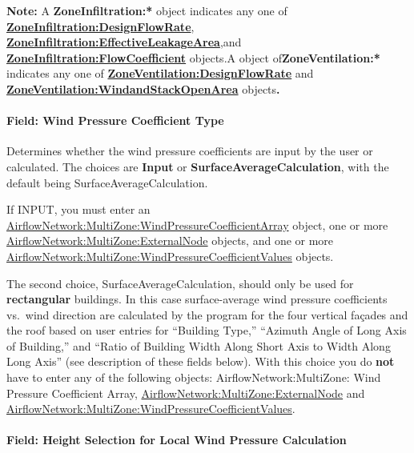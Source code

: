 \textbf{Note:} A \textbf{ZoneInfiltration:*} object indicates any one of \textbf{\hyperref[zoneinfiltrationdesignflowrate]{ZoneInfiltration:DesignFlowRate}}, \textbf{\hyperref[zoneinfiltrationeffectiveleakagearea]{ZoneInfiltration:EffectiveLeakageArea}},and \textbf{\hyperref[zoneinfiltrationflowcoefficient]{ZoneInfiltration:FlowCoefficient}} objects.A object of\textbf{ZoneVentilation:*} indicates any one of \textbf{\hyperref[zoneventilationdesignflowrate]{ZoneVentilation:DesignFlowRate}} and \textbf{\hyperref[zoneventilationwindandstackopenarea]{ZoneVentilation:WindandStackOpenArea}} objects\textbf{.}

\paragraph{Field: Wind Pressure Coefficient Type}\label{field-wind-pressure-coefficient-type}

Determines whether the wind pressure coefficients are input by the user or calculated. The choices are \textbf{Input} or \textbf{SurfaceAverageCalculation}, with the default being SurfaceAverageCalculation.

If INPUT, you must enter an \hyperref[airflownetworkmultizonewindpressurecoefficientarray]{AirflowNetwork:MultiZone:WindPressureCoefficientArray} object, one or more \hyperref[airflownetworkmultizoneexternalnode]{AirflowNetwork:MultiZone:ExternalNode} objects, and one or more \hyperref[airflownetworkmultizonewindpressurecoefficientvalues]{AirflowNetwork:MultiZone:WindPressureCoefficientValues} objects.

The second choice, SurfaceAverageCalculation, should only be used for \textbf{rectangular} buildings. In this case surface-average wind pressure coefficients vs.~wind direction are calculated by the program for the four vertical fa\c{c}ades and the roof based on user entries for ``Building Type,'' ``Azimuth Angle of Long Axis of Building,'' and ``Ratio of Building Width Along Short Axis to Width Along Long Axis'' (see description of these fields below). With this choice you do \textbf{not} have to enter any of the following objects: AirflowNetwork:MultiZone: Wind Pressure Coefficient Array, \hyperref[airflownetworkmultizoneexternalnode]{AirflowNetwork:MultiZone:ExternalNode} and \hyperref[airflownetworkmultizonewindpressurecoefficientvalues]{AirflowNetwork:MultiZone:WindPressureCoefficientValues}.

\paragraph{Field: Height Selection for Local Wind Pressure Calculation}\label{field-height-selection-for-local-wind-pressure-calculation}

